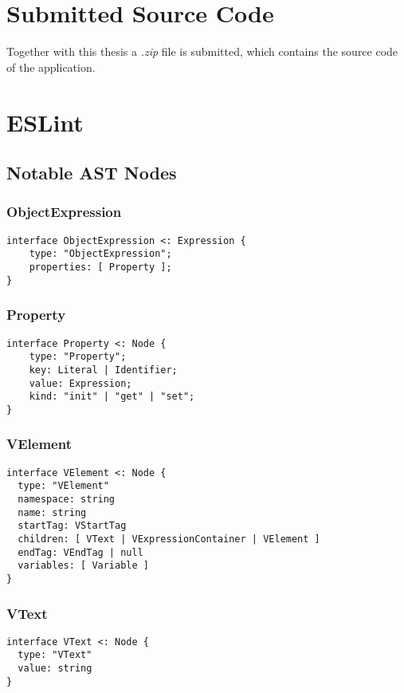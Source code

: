 \section{Submitted Source Code}
Together with this thesis a \textit{.zip} file is submitted, which contains the source code of the application.

\section{ESLint}
\subsection{Notable AST Nodes}

\subsubsection{ObjectExpression}
\label{eslint:object_expression}
\begin{lstlisting}
interface ObjectExpression <: Expression {
    type: "ObjectExpression";
    properties: [ Property ];
}
\end{lstlisting}

\subsubsection{Property}
\label{eslint:property}
\begin{lstlisting}
interface Property <: Node {
    type: "Property";
    key: Literal | Identifier;
    value: Expression;
    kind: "init" | "get" | "set";
}
\end{lstlisting}

\subsubsection{VElement}
\label{eslint:velement}
\begin{lstlisting}
interface VElement <: Node {
  type: "VElement"
  namespace: string
  name: string
  startTag: VStartTag
  children: [ VText | VExpressionContainer | VElement ]
  endTag: VEndTag | null
  variables: [ Variable ]
}
\end{lstlisting}

\subsubsection{VText}
\label{eslint:vtext}
\begin{lstlisting}
interface VText <: Node {
  type: "VText"
  value: string
}
\end{lstlisting}

